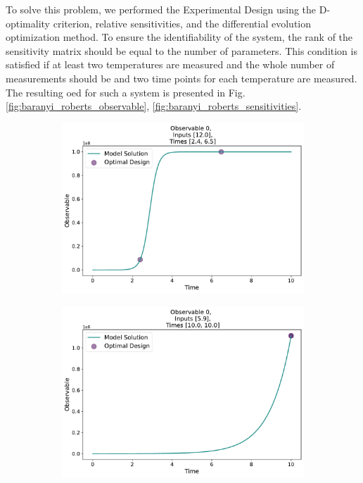 \documentclass[10pt,A4paper]{article}
\begin{document}
To solve this problem, we performed the Experimental Design using the D-optimality criterion, relative sensitivities, and the differential evolution optimization method.
To ensure the identifiability of the system, the rank of the sensitivity matrix should be equal to the number of parameters.
This condition is satisfied if at least two temperatures are measured and the whole number of measurements should be 
and two time points for each temperature are measured. 
The resulting \ac{oed} for such a system is presented in Fig. \ref{fig:baranyi_roberts_observable}, \ref{fig:baranyi_roberts_sensitivities}.
\begin{figure}[H]
    \begin{subfigure}{.9\textwidth}
        \centering
        \includegraphics[scale=0.35]{Figures/Observable_Results_baranyi_roberts_ode_fisher_determinant_rel_sensit_cont_2times_2temps_000_x_00.pdf}
      \end{subfigure}    
      \begin{subfigure}{.9\textwidth}
        \centering
        \includegraphics[scale=0.35]{Figures/Observable_Results_baranyi_roberts_ode_fisher_determinant_rel_sensit_cont_2times_2temps_001_x_00.pdf}

\end{subfigure}
\end{figure}
\end{document}

